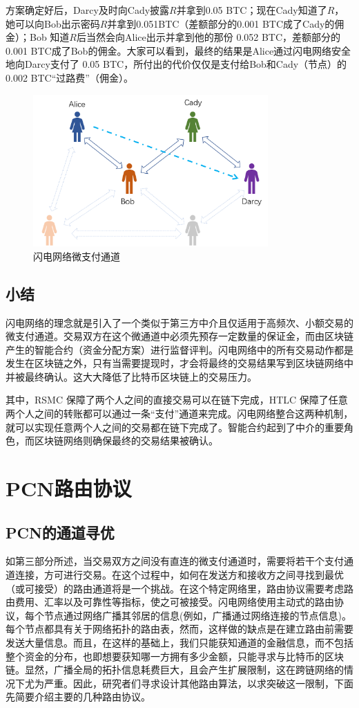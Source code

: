 \documentclass[12pt,a4paper]{article}
\begin{document}
方案确定好后，Darcy及时向Cady披露$R$并拿到0.05 BTC；现在Cady知道了$R$，她可以向Bob出示密码$R$并拿到0.051BTC（差额部分的0.001 BTC成了Cady的佣金）；Bob 知道$R$后当然会向Alice出示并拿到他的那份 0.052 BTC，差额部分的 0.001 BTC成了Bob的佣金。大家可以看到，最终的结果是Alice通过闪电网络安全地向Darcy支付了 0.05 BTC，所付出的代价仅仅是支付给Bob和Cady（节点）的 0.002 BTC“过路费”（佣金）。

\begin{figure}[htb]
\centering
\includegraphics[width=9cm]{channels}
\caption{闪电网络微支付通道}
\end{figure}

\subsection{小结}
闪电网络的理念就是引入了一个类似于第三方中介且仅适用于高频次、小额交易的微支付通道。交易双方在这个微通道中必须先预存一定数量的保证金，而由区块链产生的智能合约（资金分配方案）进行监督评判。闪电网络中的所有交易动作都是发生在区块链之外，只有当需要提现时，才会将最终的交易结果写到区块链网络中并被最终确认。这大大降低了比特币区块链上的交易压力。

其中，RSMC 保障了两个人之间的直接交易可以在链下完成，HTLC 保障了任意两个人之间的转账都可以通过一条“支付”通道来完成。闪电网络整合这两种机制，就可以实现任意两个人之间的交易都在链下完成了。智能合约起到了中介的重要角色，而区块链网络则确保最终的交易结果被确认。

\section{PCN路由协议}

\subsection{PCN的通道寻优}
如第三部分所述，当交易双方之间没有直连的微支付通道时，需要将若干个支付通道连接，方可进行交易。在这个过程中，如何在发送方和接收方之间寻找到最优（或可接受）的路由通道将是一个挑战。在这个特定网络里，路由协议需要考虑路由费用、汇率以及可靠性等指标，使之可被接受。闪电网络使用主动式的路由协议，每个节点通过网络广播其邻居的信息(例如，广播通过网络连接的节点信息)。每个节点都具有关于网络拓扑的路由表，然而，这样做的缺点是在建立路由前需要发送大量信息。而且，在这样的基础上，我们只能获知通道的金融信息，而不包括整个资金的分布，也即想要获知哪一方拥有多少金额，只能寻求与比特币的区块链。显然，广播全局的拓扑信息耗费巨大，且会产生扩展限制，这在跨链网络的情况下尤为严重。因此，研究者们寻求设计其他路由算法，以求突破这一限制，下面先简要介绍主要的几种路由协议。
\end{document}
